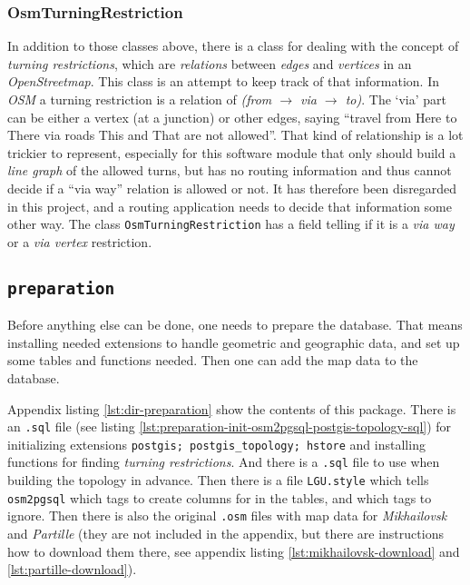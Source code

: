 \documentclass[../main.tex]{subfiles}
\begin{document}
\subsubsection{OsmTurningRestriction}\label{sect:osm-turning-restriction}
In addition to those classes above, there is a class for dealing with the concept of \textit{turning restrictions}, which are \textit{relations} between \textit{edges} and \textit{vertices} in an \textit{OpenStreetmap}. This class is an attempt to keep track of that information. In \textit{OSM} a turning restriction is a relation of \textit{(from $\rightarrow$ via $\rightarrow$ to)}. The `via' part can be either a vertex (at a junction) or other edges, saying ``travel from Here to There via roads This and That are not allowed''. That kind of relationship is a lot trickier to represent, especially for this software module that only should build a \textit{line graph} of the allowed turns, but has no routing information and thus cannot decide if a ``via way'' relation is allowed or not. It has therefore been disregarded in this project, and a routing application needs to decide that information some other way. The class \texttt{OsmTurningRestriction} has a field telling if it is a \textit{via way} or a \textit{via vertex} restriction.

\subsection{\texttt{preparation}}
Before anything else can be done, one needs to prepare the database. That means installing needed extensions to handle geometric and geographic data, and set up some tables and functions needed. Then one can add the map data to the database.

Appendix listing \ref{lst:dir-preparation} show the contents of this package. There is an \texttt{.sql} file (see listing \ref{lst:preparation-init-osm2pgsql-postgis-topology-sql}) for initializing extensions \texttt{postgis; postgis\_topology; hstore} and installing functions for finding \textit{turning restrictions}. And there is a \texttt{.sql} file to use when building the topology in advance. Then there is a file \texttt{LGU.style} which tells \texttt{osm2pgsql} which tags to create columns for in the tables, and which tags to ignore. Then there is also the original \texttt{.osm} files with map data for \textit{Mikhailovsk} and \textit{Partille} (they are not included in the appendix, but there are instructions how to download them there, see appendix listing \ref{lst:mikhailovsk-download} and \ref{lst:partille-download}).
\end{document}
